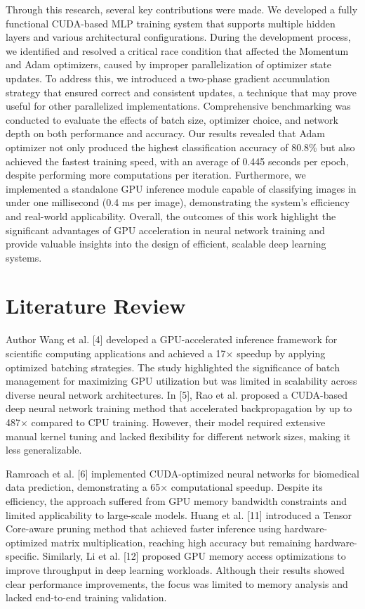 \documentclass[conference]{IEEEtran}
\begin{document}
Through this research, several key contributions were made. We developed a fully functional CUDA-based MLP training system that supports multiple hidden layers and various architectural configurations. During the development process, we identified and resolved a critical race condition that affected the Momentum and Adam optimizers, caused by improper parallelization of optimizer state updates. To address this, we introduced a two-phase gradient accumulation strategy that ensured correct and consistent updates, a technique that may prove useful for other parallelized implementations. Comprehensive benchmarking was conducted to evaluate the effects of batch size, optimizer choice, and network depth on both performance and accuracy. Our results revealed that Adam optimizer not only produced the highest classification accuracy of 80.8\% but also achieved the fastest training speed, with an average of 0.445 seconds per epoch, despite performing more computations per iteration. Furthermore, we implemented a standalone GPU inference module capable of classifying images in under one millisecond (0.4 ms per image), demonstrating the system’s efficiency and real-world applicability. Overall, the outcomes of this work highlight the significant advantages of GPU acceleration in neural network training and provide valuable insights into the design of efficient, scalable deep learning systems.

\section{Literature Review}

Author Wang et al. [4] developed a GPU-accelerated inference framework for scientific computing applications and achieved a 17× speedup by applying optimized batching strategies. The study highlighted the significance of batch management for maximizing GPU utilization but was limited in scalability across diverse neural network architectures. In [5], Rao et al. proposed a CUDA-based deep neural network training method that accelerated backpropagation by up to 487× compared to CPU training. However, their model required extensive manual kernel tuning and lacked flexibility for different network sizes, making it less generalizable.

Ramroach et al. [6] implemented CUDA-optimized neural networks for biomedical data prediction, demonstrating a 65× computational speedup. Despite its efficiency, the approach suffered from GPU memory bandwidth constraints and limited applicability to large-scale models. Huang et al. [11] introduced a Tensor Core-aware pruning method that achieved faster inference using hardware-optimized matrix multiplication, reaching high accuracy but remaining hardware-specific. Similarly, Li et al. [12] proposed GPU memory access optimizations to improve throughput in deep learning workloads. Although their results showed clear performance improvements, the focus was limited to memory analysis and lacked end-to-end training validation.
\end{document}
